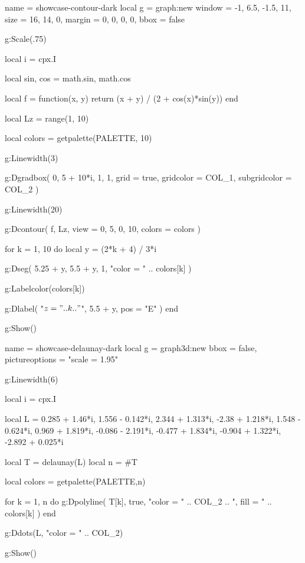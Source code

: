 \begin{luadraw}{name = showcase-contour-dark}
local g = graph:new{
  window = {-1, 6.5, -1.5, 11},
  size   = {16, 14, 0},
  margin = {0, 0, 0, 0},
  bbox   = false
}

g:Scale(.75)

local i = cpx.I

local sin, cos = math.sin, math.cos

local f = function(x, y)
  return (x + y) / (2 + cos(x)*sin(y))
end

local Lz = range(1, 10)

local colors = getpalette(PALETTE, 10)

g:Linewidth(3)

g:Dgradbox(
  {0, 5 + 10*i, 1, 1},
  {
    grid         = true,
    gridcolor    = COL_1,
    subgridcolor = COL_2
  }
)

g:Linewidth(20)

g:Dcontour(
  f,
  Lz,
  {
    view   = {0, 5, 0, 10},
    colors = colors
  }
)

for k = 1, 10 do
  local y = (2*k + 4) / 3*i

  g:Dseg(
    {5.25 + y, 5.5 + y},
    1,
    "color = " .. colors[k]
  )

  g:Labelcolor(colors[k])

  g:Dlabel(
    "$z = " .. k .. "$",
    5.5 + y,
    {pos = "E"}
  )
end

g:Show()
\end{luadraw}



\vfill

\begin{luadraw}{name = showcase-delaunay-dark}
local g = graph3d:new{
  bbox           = false,
  pictureoptions = "scale = 1.95"
}

g:Linewidth(6)

local i = cpx.I

local L = {
   0.285 + 1.46*i,
   1.556 - 0.142*i,
   2.344 + 1.313*i,
  -2.38  + 1.218*i,
   1.548 - 0.624*i,
   0.969 + 1.819*i,
  -0.086 - 2.191*i,
  -0.477 + 1.834*i,
  -0.904 + 1.322*i,
  -2.892 + 0.025*i
}

local T = delaunay(L)
local n = #T

local colors = getpalette(PALETTE,n)

for k = 1, n do
  g:Dpolyline(
    T[k],
    true,
       "color = " .. COL_2
    .. ", fill = " .. colors[k]
  )
end

g:Ddots(L, "color = " .. COL_2)

g:Show()
\end{luadraw}


